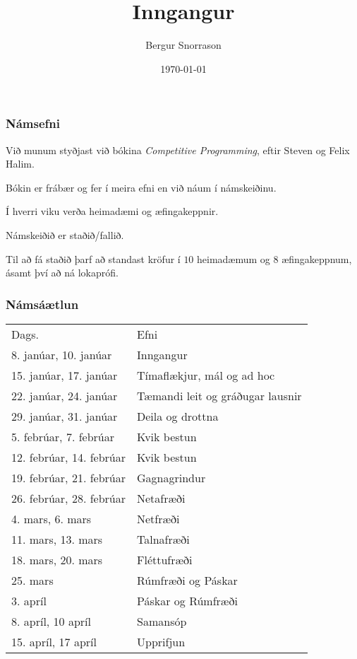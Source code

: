 \title{Inngangur}
\author{Bergur Snorrason}
\date{\today}



\frame{\titlepage}

{
    \frametitle{Námsefni}
    {
        \item<1-> Við munum styðjast við bókina \emph{Competitive Programming}, eftir Steven og Felix Halim.
        \item<2-> Bókin er frábær og fer í meira efni en við náum í námskeiðinu.
        \item<3-> Í hverri viku verða heimadæmi og æfingakeppnir.
        \item<4-> Námskeiðið er staðið/fallið.
        \item<5-> Til að fá staðið þarf að standast kröfur í $10$ heimadæmum og $8$ æfingakeppnum,
                    ásamt því að ná lokaprófi.
    }
}

{
    \frametitle{Námsáætlun}
    \begin{tabular}{l l}
        Dags. & Efni\\
        8. janúar, 10. janúar & Inngangur\\
        15. janúar, 17. janúar & Tímaflækjur, mál og ad hoc\\
        22. janúar, 24. janúar & Tæmandi leit og gráðugar lausnir\\
        29. janúar, 31. janúar & Deila og drottna\\
        5. febrúar, 7. febrúar & Kvik bestun\\
        12. febrúar, 14. febrúar & Kvik bestun\\
        19. febrúar, 21. febrúar & Gagnagrindur\\
        26. febrúar, 28. febrúar & Netafræði\\
        4. mars, 6. mars & Netfræði\\
        11. mars, 13. mars & Talnafræði\\
        18. mars, 20. mars & Fléttufræði\\
        25. mars & Rúmfræði og Páskar\\
        3. apríl & Páskar og Rúmfræði\\
        8. apríl, 10 apríl & Samansóp\\
        15. apríl, 17 apríl & Upprifjun\\
    \end{tabular}
}

